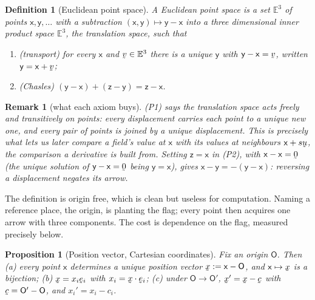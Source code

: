 \documentclass[17pt,a4paper]{extreport}
\DeclareRobustCommand{\vek}[1]{\underaccent{\tilde}{#1}}
\newcommand{\Et}{\mathbb{E}^{3}}
\newcommand{\bc}{\vek{c}}
\newcommand{\bu}{\vek{u}}
\newcommand{\bv}{\vek{v}}
\newcommand{\bx}{\vek{x}}
\newcommand{\be}{\vek{e}}
\newcommand{\bze}{\vek{0}}
\newcommand{\ip}[2]{#1\cdot#2}
\theoremstyle{scplain}
\newtheorem{proposition}[theorem]{Proposition}
\theoremstyle{scdefn}
\newtheorem{definition}[theorem]{Definition}
\newtheorem{remark}[theorem]{Remark}
\theoremstyle{scplain}
\begin{document}
\begin{definition}[Euclidean point space]\label{def:eps}
A Euclidean point space is a set $\Et$ of points
$\mathsf{x},\mathsf{y},\dots$ with a subtraction
$(\mathsf{x},\mathsf{y})\mapsto\mathsf{y}-\mathsf{x}$ into a three
dimensional inner product space $\Et$, the translation space, such that
\begin{enumerate}[label=\textup{(P\arabic*)},leftmargin=2.6em]
\item \textup{(transport)} for every $\mathsf{x}$ and $\bv\in\Et$ there is
      a unique $\mathsf{y}$ with $\mathsf{y}-\mathsf{x}=\bv$, written
      $\mathsf{y}=\mathsf{x}+\bv$;
\item \textup{(Chasles)} $(\mathsf{y}-\mathsf{x})+(\mathsf{z}-\mathsf{y})
      =\mathsf{z}-\mathsf{x}$.
\end{enumerate}
\end{definition}

\begin{remark}[what each axiom buys]\label{rem:axioms}
(P1) says the translation space acts freely and transitively on points:
every displacement carries each point to a unique new one, and every pair
of points is joined by a unique displacement. This is precisely what lets
us later compare a field's value at $\mathsf{x}$ with its values at
neighbours $\mathsf{x}+s\bu$, the comparison a derivative is built from.
Setting $\mathsf{z}=\mathsf{x}$ in (P2), with $\mathsf{x}-\mathsf{x}=\bze$
(the unique solution of $\mathsf{y}-\mathsf{x}=\bze$ being
$\mathsf{y}=\mathsf{x}$), gives $\mathsf{x}-\mathsf{y}
=-(\mathsf{y}-\mathsf{x})$: reversing a displacement negates its arrow.
\end{remark}

The definition is origin free, which is clean but useless for computation.
Naming a reference place, the origin, is planting the flag; every point
then acquires one arrow with three components. The cost is dependence on
the flag, measured precisely below.

\begin{proposition}[Position vector, Cartesian coordinates]\label{prop:posvec}
Fix an origin $\mathsf{O}$. Then (a) every point $\mathsf{x}$ determines a
unique position vector $\bx:=\mathsf{x}-\mathsf{O}$, and
$\mathsf{x}\mapsto\bx$ is a bijection; (b) $\bx=x_i\be_i$ with
$x_i=\ip\bx{\be_i}$; (c) under $\mathsf{O}\to\mathsf{O}'$,
$\bx'=\bx-\bc$ with $\bc=\mathsf{O}'-\mathsf{O}$, and $x_i'=x_i-c_i$.
\end{proposition}
\end{document}
